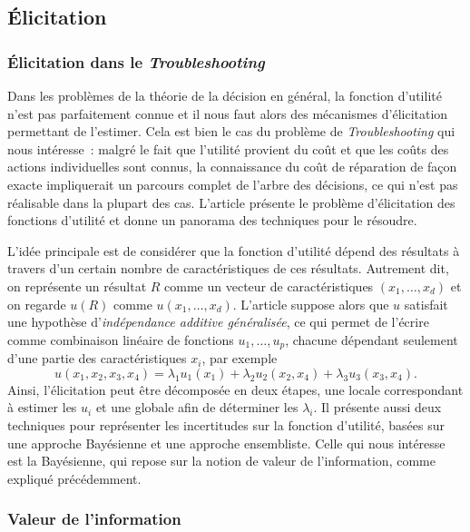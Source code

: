 \documentclass[a4paper,11pt]{article}
\theoremstyle{plain}
\begin{document}
\subsection{Élicitation}

\subsubsection{Élicitation dans le \emph{Troubleshooting}}

Dans les problèmes de la théorie de la décision en général, la fonction d'utilité n'est pas parfaitement connue et il nous faut alors des mécanismes d'élicitation permettant de l'estimer. Cela est bien le cas du problème de \emph{Troubleshooting} qui nous intéresse~: malgré le fait que l'utilité provient du coût et que les coûts des actions individuelles sont connus, la connaissance du coût de réparation de façon exacte impliquerait un parcours complet de l'arbre des décisions, ce qui n'est pas réalisable dans la plupart des cas. L'article \cite{Braziunas_2008} présente le problème d'élicitation des fonctions d'utilité et donne un panorama des techniques pour le résoudre.

L'idée principale est de considérer que la fonction d'utilité dépend des résultats à travers d'un certain nombre de caractéristiques de ces résultats. Autrement dit, on représente un résultat $R$ comme un vecteur de caractéristiques $(x_1, \dotsc, x_d)$ et on regarde $u(R)$ comme $u(x_1, \dotsc, x_d)$. L'article \cite{Braziunas_2008} suppose alors que $u$ satisfait une hypothèse d'\emph{indépendance additive généralisée}, ce qui permet de l'écrire comme combinaison linéaire de fonctions $u_1, \dotsc, u_p$, chacune dépendant seulement d'une partie des caractéristiques $x_i$, par exemple
\[u(x_1, x_2, x_3, x_4) = \lambda_1 u_1(x_1) + \lambda_2 u_2(x_2, x_4) + \lambda_3 u_3(x_3, x_4).\]
Ainsi, l'élicitation peut être décomposée en deux étapes, une locale correspondant à estimer les $u_i$ et une globale afin de déterminer les $\lambda_i$. Il présente aussi deux techniques pour représenter les incertitudes sur la fonction d'utilité, basées sur une approche Bayésienne et une approche ensembliste. Celle qui nous intéresse est la Bayésienne, qui repose sur la notion de valeur de l'information, comme expliqué précédemment.

\subsubsection{Valeur de l'information}
\end{document}
